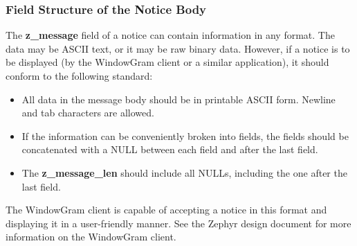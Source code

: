 \subsubsection{Field Structure of the Notice Body}

The {\bf z_message} field of a notice can contain information in any
format.  The data may be ASCII text, or it may be raw binary data.
However, if a notice is to be displayed (by the WindowGram client or a
similar application), it should conform to the following standard:

\begin{itemize}
\item All data in the message body should be in printable ASCII form.
Newline and tab characters are allowed.
\item If the information can be conveniently broken into fields, the
fields should be concatenated with a NULL between each field and after
the last field.
\item The {\bf z_message_len} should include all NULLs, including
the one after the last field.
\end{itemize}

The WindowGram client is capable of accepting a notice in this format
and displaying it in a user-friendly manner.  See the Zephyr design
document \cite{zephyr-design} for more information on the WindowGram
client.

